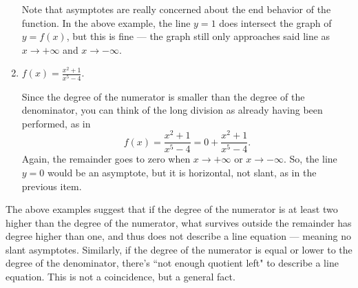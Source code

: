 \documentclass{ximera}
\begin{document}
\begin{example}
\begin{enumerate}
\begin{explanation}
      Note that asymptotes are really concerned about the end behavior of the function. In the above example, the line $y=1$ does intersect the graph of $y=f(x)$, but this is fine --- the graph still only approaches said line as $x \to +\infty$ and $x \to -\infty$.
   \end{explanation}
  \item $f(x) = \frac{x^2+1}{x^5-4}$. \\[1em]
    \begin{explanation}
      Since the degree of the numerator is smaller than the degree of the denominator, you can think of the long division as already having been performed, as in $$ f(x) = \frac{x^2+1}{x^5-4} = 0 + \frac{x^2+1}{x^5-4}.  $$Again, the remainder goes to zero when $x \to +\infty$ or $x\to -\infty$. So, the line $y=0$ would be an asymptote, but it is horizontal, not slant, as in the previous item.

  \begin{image}
 \end{image}

      
    \end{explanation}
  \end{enumerate}

\end{example}

The above examples suggest that if the degree of the numerator is at least two higher than the degree of the numerator, what survives outside the remainder has degree higher than one, and thus does not describe a line equation --- meaning no slant asymptotes. Similarly, if the degree of the numerator is equal or lower to the degree of the denominator, there's ``not enough quotient left" to describe a line equation. This is not a coincidence, but a general fact.
\end{document}
